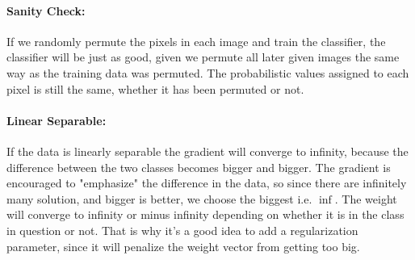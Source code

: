 \documentclass[paper=a4, fontsize=11pt]{scrartcl} %
\numberwithin{equation}{section} %
\numberwithin{figure}{section} %
\numberwithin{table}{section} %
\begin{document}
\paragraph{Sanity Check:} If we randomly permute the pixels in each image and train the classifier, the classifier will be just as good, given we permute all later given images the same way as the training data was permuted. The probabilistic values assigned to each pixel is still the same, whether it has been permuted or not. 
\paragraph{Linear Separable:} If the data is linearly separable the gradient will converge to infinity, because the difference between the two classes becomes bigger and bigger. The gradient is encouraged to "emphasize" the difference in the data, so since there are infinitely many solution, and bigger is better, we choose the biggest i.e. $\inf$. The weight will converge to infinity or minus infinity depending on whether it is in the class in question or not. That is why it's a good idea to add a regularization parameter, since it will penalize the weight vector from getting too big. 
\end{document}

